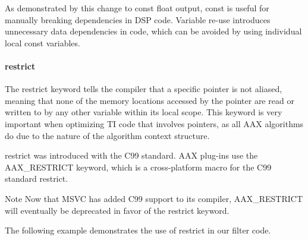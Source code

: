 As demonstrated by this change to {\ttfamily const float output}, {\ttfamily const} is useful for manually breaking dependencies in D\+SP code. Variable re-\/use introduces unnecessary data dependencies in code, which can be avoided by using individual local const variables.

\hypertarget{a00832_subsubsection__restrict_}{}\paragraph{restrict}\label{a00832_subsubsection__restrict_}
 The {\ttfamily restrict} keyword tells the compiler that a specific pointer is not aliased, meaning that none of the memory locations accessed by the pointer are read or written to by any other variable within its local scope. This keyword is very important when optimizing TI code that involves pointers, as all A\+AX algorithms do due to the nature of the algorithm context structure.

{\ttfamily restrict} was introduced with the C99 standard. A\+AX plug-\/ins use the {\ttfamily A\+A\+X\+\_\+\+R\+E\+S\+T\+R\+I\+CT} keyword, which is a cross-\/platform macro for the C99 standard restrict.

\begin{DoxyNote}{Note}
Now that M\+S\+VC has added C99 support to its compiler, {\ttfamily A\+A\+X\+\_\+\+R\+E\+S\+T\+R\+I\+CT} will eventually be deprecated in favor of the {\ttfamily restrict} keyword.
\end{DoxyNote}
The following example demonstrates the use of restrict in our filter code.


